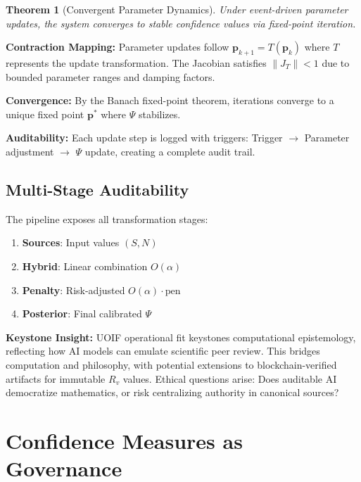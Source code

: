 \documentclass[12pt,a4paper]{article}
\newtheorem{theorem}{Theorem}[section]
\theoremstyle{definition}
\theoremstyle{remark}
\begin{document}
\begin{theorem}[Convergent Parameter Dynamics]
Under event-driven parameter updates, the system converges to stable confidence values via fixed-point iteration.
\end{theorem}

\begin{proofbox}
\textbf{Contraction Mapping:} Parameter updates follow $\mathbf{p}_{k+1} = T(\mathbf{p}_k)$ where $T$ represents the update transformation. The Jacobian satisfies $\|J_T\| < 1$ due to bounded parameter ranges and damping factors.

\textbf{Convergence:} By the Banach fixed-point theorem, iterations converge to a unique fixed point $\mathbf{p}^*$ where $\Psi$ stabilizes.

\textbf{Auditability:} Each update step is logged with triggers: Trigger $\rightarrow$ Parameter adjustment $\rightarrow$ $\Psi$ update, creating a complete audit trail.
\end{proofbox}

\subsection{Multi-Stage Auditability}

The pipeline exposes all transformation stages:
\begin{enumerate}
    \item \textbf{Sources}: Input values $(S, N)$
    \item \textbf{Hybrid}: Linear combination $O(\alpha)$
    \item \textbf{Penalty}: Risk-adjusted $O(\alpha) \cdot \text{pen}$
    \item \textbf{Posterior}: Final calibrated $\Psi$
\end{enumerate}

\begin{reflectionbox}
\textbf{Keystone Insight:} UOIF operational fit keystones computational epistemology, reflecting how AI models can emulate scientific peer review. This bridges computation and philosophy, with potential extensions to blockchain-verified artifacts for immutable $R_v$ values. Ethical questions arise: Does auditable AI democratize mathematics, or risk centralizing authority in canonical sources?
\end{reflectionbox}

\section{Confidence Measures as Governance}
\end{document}
